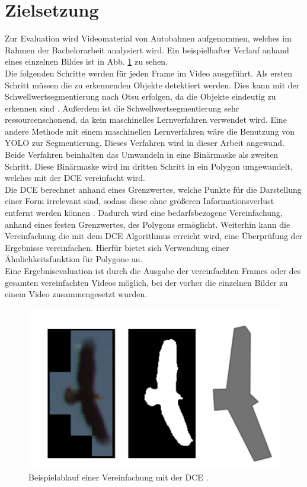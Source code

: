 \section{Zielsetzung}{ 
Zur Evaluation wird Videomaterial von Autobahnen aufgenommen, welches im Rahmen der Bachelorarbeit analysiert wird. Ein beispielhafter Verlauf anhand eines einzelnen Bildes ist in Abb. \ref{Bsp_Dorr} zu sehen. \\
Die folgenden Schritte werden für jeden Frame im Video ausgeführt. 
Als ersten Schritt müssen die zu erkennenden Objekte detektiert werden. Dies kann mit der Schwellwertsegmentierung nach Otsu erfolgen, da die Objekte eindeutig zu erkennen sind \citep{Otsu1979}. Außerdem ist die Schwellwertsegmentierung sehr ressourcenschonend, da kein maschinelles Lernverfahren verwendet wird. Eine andere Methode mit einem maschinellen Lernverfahren wäre die Benutzung von YOLO zur Segmentierung. Dieses Verfahren wird in dieser Arbeit angewand. Beide Verfahren beinhalten das Umwandeln in eine Binärmaske als zweiten Schritt. Diese Binärmaske wird im dritten Schritt in ein Polygon umgewandelt, welches mit der DCE vereinfacht wird. \\
Die DCE berechnet anhand eines Grenzwertes, welche Punkte für die Darstellung einer Form irrelevant sind, sodass diese ohne größeren Informationsverlust entfernt werden können \citep{Barkowsky2000}. Dadurch wird eine bedarfsbezogene Vereinfachung, anhand eines festen Grenzwertes, des Polygons ermöglicht. 
Weiterhin kann die Vereinfachung die mit dem DCE Algorithmus erreicht wird, eine Überprüfung der Ergebnisse vereinfachen. Hierfür bietet sich Verwendung einer Ähnlichkeitsfunktion für Polygone an. \\
Eine Ergebnisevaluation ist durch die Ausgabe der vereinfachten Frames  oder des gesamten vereinfachten Videos möglich, bei der vorher die einzelnen Bilder zu einem Video zusammengesetzt wurden. \\}
\begin{figure}[ht]
	\vspace{-0.5cm}
	   \centering
	   \includegraphics*[scale = 0.5, keepaspectratio, trim=2 2 2 2 ]{images/Example_bird.png}
	   \caption[Beispielablauf der Segmentierung und DCE]{Beispielablauf einer Vereinfachung mit der DCE \citep{Dorr2017}.}
	   \label{Bsp_Dorr}
\end{figure}
